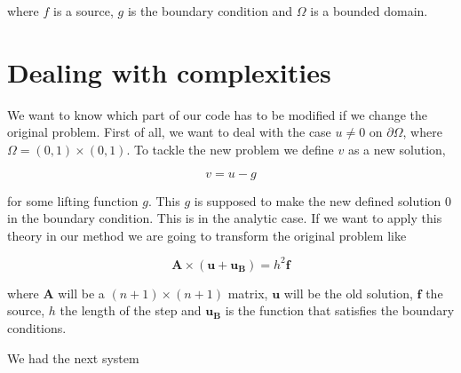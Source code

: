 \documentclass[fontsize=11pt,paper=a4,titlepage]{report}
\begin{document}
where $f$ is a source, $g$ is the boundary condition and $\Omega$ is a bounded 
domain.



\section{Dealing with complexities}


We want to know which part of our code has to be modified if we change the 
original problem. First of all, we want to deal with the case $u \neq 0$ on 
$\partial\Omega$, where $\Omega = (0,1) \times (0,1)$. To tackle the new problem
we define $v$ as a new solution,

\begin{equation}
	v = u - g
\end{equation}

for some lifting function $g$. This $g$ is supposed to make the new defined 
solution $0$ in the boundary condition.
This is in the analytic case. If we want to apply this theory in our method we
are going to transform the original problem like

\begin{displaymath}
	\mathbf{A} \times (\mathbf{u} + \mathbf{u_B}) = h^2 \mathbf{f}
\end{displaymath}

where $\mathbf{A}$ will be a $(n + 1) \times (n + 1)$ matrix, $\mathbf{u}$ will 
be the old solution, $\mathbf{f}$ the source, $h$ the length of the step and 
$\mathbf{u_B}$ is the function that satisfies the boundary conditions.

We had the next system
\end{document}
